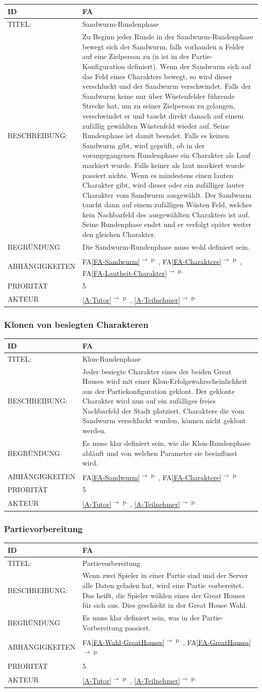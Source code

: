 \documentclass[12pt]{article}
\newcounter{fa}
\newcommand{\fa}[7]{
\refstepcounter{fa}\label{#7}
\begin{tabularx}{16cm}{l|X}
\textbf{ID} & \textbf{FA\arabic{fa}} \\
\hline
TITEL: & #1 \\
\hline
BESCHREIBUNG: & #2 \\
\hline
BEGRÜNDUNG & #3 \\ 
\hline
ABHÄNGIGKEITEN & #4\\ 
\hline 
PRIORITÄT & #5\\ 
\hline 
AKTEUR & #6
\end{tabularx}
\vspace*{0.75cm}
}
\newcommand{\rref}[1]{\ref{#1}\textsuperscript{$\rightarrow$ p. \pageref{#1}}}
\newcommand{\faref}[1]{FA\ref{#1}\textsuperscript{$\rightarrow$ p. \pageref{#1}}}
\begin{document}
\fa{Sandwurm-Rundenphase}{ Zu Beginn jeder Runde in der Sandwurm-Rundenphase bewegt sich der Sandwurm, falls vorhanden n Felder auf eine Zielperson zu (n ist in der Partie-Konfiguration definiert). Wenn der Sandwurm sich auf das Feld eines Charakters bewegt, so wird dieser verschluckt und der Sandwurm verschwindet. Falls der Sandwurm keine nur über Wüstenfelder führende Strecke hat, um zu seiner Zielperson zu gelangen, verschwindet er und taucht direkt danach auf einem zufällig gewählten Wüstenfeld wieder auf. Seine Rundenphase ist damit beendet. Falls es keinen Sandwurm gibt, wird geprüft, ob in der vorangegangenen Rundenphase ein Charakter als Lauf markiert wurde. Falls keiner als laut markiert wurde passiert nichts. Wenn es mindestens einen lauten Charakter gibt, wird dieser oder ein zufälliger lauter Charakter vom Sandwurm ausgewählt. Der Sandwurm taucht dann auf einem zufälligen Wüsten Feld, welches kein Nachbarfeld des ausgewählten Charakters ist auf. Seine Rundenphase endet und er verfolgt später weiter den gleichen Charakter.}{Die Sandwurm-Rundenphase muss wohl definiert sein.}{\faref{FA-Sandwurm}, \faref{FA-Charaktere}, \faref{FA-Lautheit-Charakter}}{5}{\rref{A-Tutor}, \rref{A-Teilnehmer}}{FA-Phase-Sandwurm}

\subsubsection*{Klonen von besiegten Charakteren}

\fa{Klon-Rundenphase}{Jeder besiegte Charakter eines der beiden Great Houses wird mit einer Klon-Erfolgswahrscheinlichkeit aus der Partiekonfiguration geklont. Der geklonte Charakter wird nun auf ein zufälliges freies Nachbarfeld der Stadt platziert. Charaktere die vom Sandwurm verschluckt wurden, können nicht geklont werden.}{Es muss klar definiert sein, wie die Klon-Rundenphase abläuft und von welchen Parameter sie beeinflusst wird.}{\faref{FA-Sandwurm}, \faref{FA-Charaktere}}{5}{\rref{A-Tutor}, \rref{A-Teilnehmer}}{FA-Phase-Klon}

\subsubsection*{Partievorbereitung}

\fa{Partievorbereitung}{Wenn zwei Spieler in einer Partie sind und der Server alle Daten geladen hat, wird eine Partie vorbereitet. Das heißt, die Spieler wählen eines der Great Houses für sich aus. Dies geschieht in der Great House Wahl.}{Es muss klar definiert sein, was in der Partie-Vorbereitung passiert. }{\faref{FA-Wahl-GreatHouses}, \faref{FA-GreatHouses}}{5}{\rref{A-Tutor}, \rref{A-Teilnehmer}}{FA-Partievorbereitung}
\end{document}
